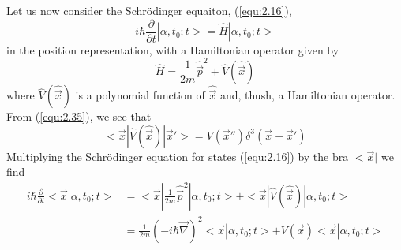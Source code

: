 Let us now consider the Schrödinger equaiton,
(\ref{equ:2.16}),
$$
  i\hbar \frac{\partial}{\partial t} |\alpha,t_0;t> =
  \hat{H}|\alpha,t_0;t>
$$
in the position representation, with a Hamiltonian operator
given by
\begin{equation}
  \hat{H} = \frac{1}{2m} \hat{\vec{p}}^2 +
  \hat{V}(\hat{\vec{x}})
  \label{equ:2.36}
\end{equation}
where $\hat{V}(\hat{\vec{x}})$ is a polynomial function of
$\hat{\vec{x}}$ and, thush, a Hamiltonian operator. From
(\ref{equ:2.35}), we see that
\begin{equation}
  <\vec{x}|\hat{V}(\hat{\vec{x}})|\vec{x}'> =
  V(\vec{x}'')\delta^3(\vec{x}-\vec{x}')
  \label{equ:2.37}
\end{equation}
Multiplying the Schrödinger equation for states
(\ref{equ:2.16}) by the bra $<\vec{x}|$ we find
\begin{align*}
  i\hbar \frac{\partial}{\partial t} <\vec{x}|\alpha,t_0;t>
  &=
  <\vec{x}|\frac{1}{2m} \hat{\vec{p}}^2 |\alpha,t_0;t> +
  <\vec{x}|\hat{V}(\hat{\vec{x}})|\alpha,t_0;t>\\
  &=
  \frac{1}{2m}(-i\hbar \vec{\nabla})^2
  <\vec{x}|\alpha,t_0;t> + V(\vec{x}) <\vec{x}|\alpha,t_0;t>
\end{align*}
